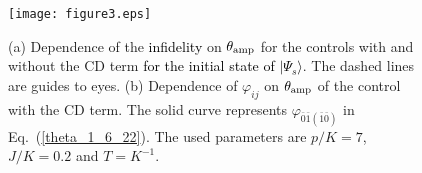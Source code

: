 \documentclass[%
 reprint,
 amsmath,amssymb,
 aps,
pra,
]{revtex4-2}
\begin{document}
\begin{figure}[h!]
\begin{center}
\texttt{[image: figure3.eps]}
\end{center}
\caption{
(a) Dependence of the \textcolor{black}{infidelity} on $\theta_{\rm amp}$ for the controls with and without the CD term \textcolor{black}{for the initial state of $|\Psi_s\rangle$}. 
The dashed lines are guides to eyes.
(b) Dependence of $\varphi_{ij}$ on $\theta_{\rm amp}$ of the control with the CD term.
The solid curve represents $\varphi_{\bar{0}\bar{1}(\bar{1}\bar{0})}$ in Eq.~{(\ref{theta_1_6_22})}.
The used parameters are $p/K=7$, $J/K=0.2$ and $T=K^{-1}$.
}
\label{fid_sft1_11_30_21}
\end{figure}


\end{document}
